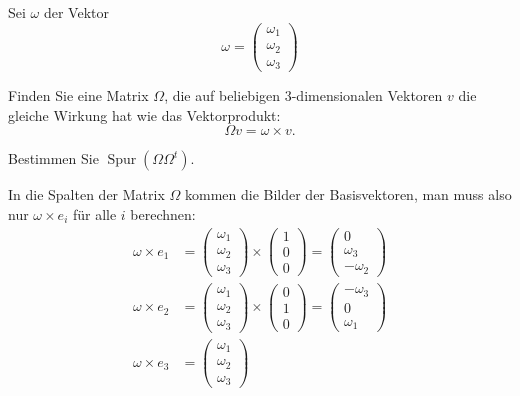 Sei $\omega$ der Vektor
\[
\omega=\begin{pmatrix}\omega_1\\\omega_2\\\omega_3\end{pmatrix}
\]
\begin{teilaufgaben}
\item
Finden Sie eine Matrix $\Omega$, die auf beliebigen $3$-dimensionalen Vektoren $v$ die gleiche
Wirkung hat wie das Vektorprodukt:
\[
\Omega v=\omega\times v.
\]
\item Bestimmen Sie $\operatorname{Spur}(\Omega\Omega^t)$.
\end{teilaufgaben}

\begin{loesung}
\begin{teilaufgaben}
\item In die Spalten der Matrix $\Omega$ kommen die Bilder der Basisvektoren,
man muss also nur $\omega\times e_i$ für alle $i$ berechnen:
\begin{align*}
\omega\times e_1
&=
\begin{pmatrix}\omega_1\\\omega_2\\\omega_3\end{pmatrix}
\times
\begin{pmatrix}1\\0\\0\end{pmatrix}
=
\begin{pmatrix}0\\\omega_3\\-\omega_2\end{pmatrix}
\\
\omega\times e_2
&=
\begin{pmatrix}\omega_1\\\omega_2\\\omega_3\end{pmatrix}
\times
\begin{pmatrix}0\\1\\0\end{pmatrix}
=
\begin{pmatrix}-\omega_3\\0\\\omega_1\end{pmatrix}
\\
\omega\times e_3
&=
\begin{pmatrix}\omega_1\\\omega_2\\\omega_3\end{pmatrix}

\end{align*}
\end{teilaufgaben}
\end{loesung}
